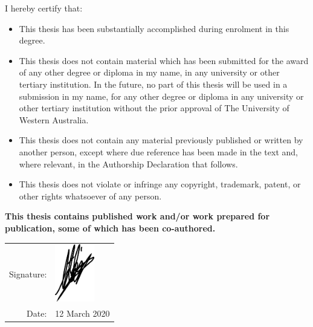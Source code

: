 
\begin{declaration}


I hereby certify that:
\begin{itemize}
	\item This thesis has been substantially accomplished during enrolment in this degree.
	\item This thesis does not contain material which has been submitted for the award of any other degree or diploma in my name, in any university or other tertiary institution.
	In the future, no part of this thesis will be used in a submission in my name, for any other degree or diploma in any university or other tertiary institution without the prior approval of The University of Western Australia.
	\item This thesis does not contain any material previously published or written by another person, except where due reference has been made in the text and, where relevant, in the Authorship Declaration that follows. 
	\item This thesis does not violate or infringe any copyright, trademark, patent, or other rights whatsoever of any person.
\end{itemize}

\textbf{This thesis contains published work and/or work prepared for publication, some of which has been co-authored.}

\vspace{1ex}

\begin{table}[H]
	\flushleft
	\begin{tabular}{rl}
		Signature: & \includegraphics[height=2.5cm]{Declaration/Img/kaili.pdf}\\
		Date: & 12 March 2020\\%
	\end{tabular}
\end{table}




\end{declaration}

